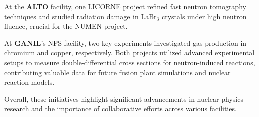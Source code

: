 At the \textbf{ALTO} facility, one LICORNE project refined fast neutron tomography techniques and studied radiation damage in LaBr$_{3}$ crystals under high neutron fluence, crucial for the NUMEN project. 

At \textbf{GANIL}'s NFS facility, two key experiments investigated gas production in chromium and copper, respectively. Both projects utilized advanced experimental setups to measure double-differential cross sections for neutron-induced reactions, contributing valuable data for future fusion plant simulations and nuclear reaction models.

Overall, these initiatives highlight significant advancements in nuclear physics research and the importance of collaborative efforts across various facilities.